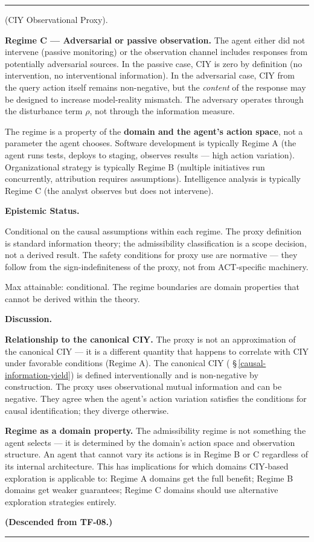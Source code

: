 \documentclass[11pt,oneside]{article}
\newcounter{claim}[section]
\renewcommand{\theclaim}{\thesection.\arabic{claim}}
\newenvironment{segment}[2]{%
  \refstepcounter{claim}%
  \bigskip\noindent\hrule\smallskip
  \noindent{\bfseries #1~\theclaim}\enskip(#2).\par\smallskip
  \noindent\ignorespaces
}{%
  \par\smallskip\noindent\hrule\bigskip
}
\newenvironment{scope}[1][]{\begin{segment}{Scope}{#1}}{\end{segment}}
\begin{document}
\begin{scope}[CIY Observational Proxy]
\textbf{Regime C — Adversarial or passive observation.} The agent either did not intervene (passive monitoring) or the observation channel includes responses from potentially adversarial sources. In the passive case, CIY is zero by definition (no intervention, no interventional information). In the adversarial case, CIY from the query action itself remains non-negative, but the \textit{content} of the response may be designed to increase model-reality mismatch. The adversary operates through the disturbance term $\rho$, not through the information measure.

The regime is a property of the \textbf{domain and the agent's action space}, not a parameter the agent chooses. Software development is typically Regime A (the agent runs tests, deploys to staging, observes results — high action variation). Organizational strategy is typically Regime B (multiple initiatives run concurrently, attribution requires assumptions). Intelligence analysis is typically Regime C (the analyst observes but does not intervene).


\medskip\noindent\textbf{Epistemic Status.}


Conditional on the causal assumptions within each regime. The proxy definition is standard information theory; the admissibility classification is a scope decision, not a derived result. The safety conditions for proxy use are normative — they follow from the sign-indefiniteness of the proxy, not from ACT-specific machinery.

Max attainable: conditional. The regime boundaries are domain properties that cannot be derived within the theory.


\medskip\noindent\textbf{Discussion.}


\textbf{Relationship to the canonical CIY.} The proxy is not an approximation of the canonical CIY — it is a different quantity that happens to correlate with CIY under favorable conditions (Regime A). The canonical CIY ( \S\,\ref{causal-information-yield}) is defined interventionally and is non-negative by construction. The proxy uses observational mutual information and can be negative. They agree when the agent's action variation satisfies the conditions for causal identification; they diverge otherwise.

\textbf{Regime as a domain property.} The admissibility regime is not something the agent selects — it is determined by the domain's action space and observation structure. An agent that cannot vary its actions is in Regime B or C regardless of its internal architecture. This has implications for which domains CIY-based exploration is applicable to: Regime A domains get the full benefit; Regime B domains get weaker guarantees; Regime C domains should use alternative exploration strategies entirely.

\textbf{(Descended from TF-08.)}

\end{scope}
\end{document}
